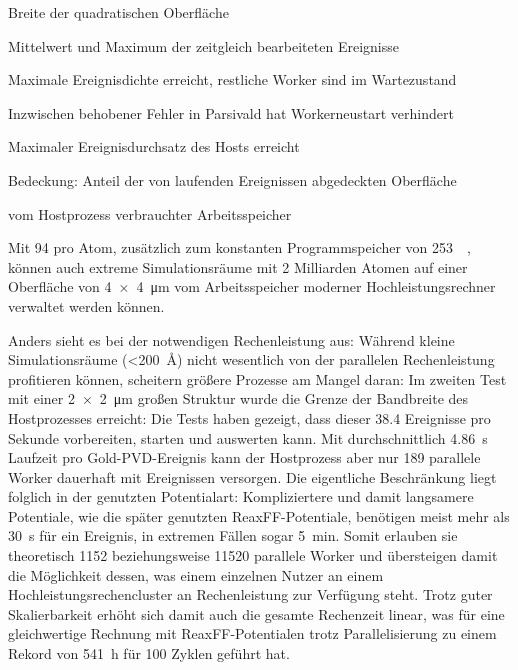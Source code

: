 \begin{table}
\begin{threeparttable}
    \begin{tablenotes}
    \item[2] Breite der quadratischen Oberfläche
    \item[a] Mittelwert und Maximum der zeitgleich bearbeiteten Ereignisse
    \item[b] Maximale Ereignisdichte erreicht, restliche Worker sind im Wartezustand
    \item[c] Inzwischen behobener Fehler in Parsivald hat Workerneustart verhindert
    \item[d] Maximaler Ereignisdurchsatz des Hosts erreicht
    \item[e] Bedeckung: Anteil der von laufenden Ereignissen abgedeckten Oberfläche
    \item[f] vom Hostprozess verbrauchter Arbeitsspeicher
    \end{tablenotes}

  \end{threeparttable}
\end{table}

Mit \SI{94}{\byte} pro Atom, zusätzlich zum konstanten Programmspeicher von \SI{253}{\mebi\byte}, können auch extreme Simulationsräume mit 2 Milliarden Atomen auf einer Oberfläche von \SI{4x4}{\micro\meter} vom Arbeitsspeicher moderner Hochleistungsrechner verwaltet werden können.

Anders sieht es bei der notwendigen Rechenleistung aus:
Während kleine Simulationsräume (\SI{<200}{\angstrom}) nicht wesentlich von der parallelen Rechenleistung profitieren können, scheitern größere Prozesse am Mangel daran:
Im zweiten Test mit einer \SI{2x2}{\micro\meter} großen Struktur wurde die Grenze der Bandbreite des Hostprozesses erreicht:
Die Tests haben gezeigt, dass dieser \num{38.4} Ereignisse pro Sekunde vorbereiten, starten und auswerten kann.
Mit durchschnittlich \SI{4.86}{\second} Laufzeit pro Gold-PVD-Ereignis kann der Hostprozess aber nur 189 parallele Worker dauerhaft mit Ereignissen versorgen.
Die eigentliche Beschränkung liegt folglich in der genutzten Potentialart:
Kompliziertere und damit langsamere Potentiale, wie die später genutzten ReaxFF-Potentiale, benötigen meist mehr als \SI{30}{\second} für ein Ereignis, in extremen Fällen sogar \SI{5}{\minute}.
Somit erlauben sie theoretisch \num{1152} beziehungsweise \num{11520} parallele Worker und übersteigen damit die Möglichkeit dessen, was einem einzelnen Nutzer an einem Hochleistungsrechencluster an Rechenleistung zur Verfügung steht.
Trotz guter Skalierbarkeit erhöht sich damit auch die gesamte Rechenzeit linear, was für eine gleichwertige Rechnung mit ReaxFF-Potentialen trotz Parallelisierung zu einem Rekord von \SI{541}{\hour} für 100 Zyklen geführt hat.

